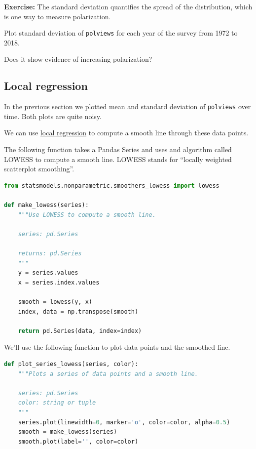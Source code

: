 \textbf{Exercise:} The standard deviation quantifies the spread of the
distribution, which is one way to measure polarization.

Plot standard deviation of \passthrough{\lstinline!polviews!} for each
year of the survey from 1972 to 2018.

Does it show evidence of increasing polarization?

\hypertarget{local-regression}{%
\subsection{Local regression}\label{local-regression}}

In the previous section we plotted mean and standard deviation of
\passthrough{\lstinline!polviews!} over time. Both plots are quite
noisy.

We can use \href{https://en.wikipedia.org/wiki/Local_regression}{local
regression} to compute a smooth line through these data points.

The following function takes a Pandas Series and uses and algorithm
called LOWESS to compute a smooth line. LOWESS stands for ``locally
weighted scatterplot smoothing''.

\begin{lstlisting}[language=Python,style=source]
from statsmodels.nonparametric.smoothers_lowess import lowess

def make_lowess(series):
    """Use LOWESS to compute a smooth line.
    
    series: pd.Series
    
    returns: pd.Series
    """
    y = series.values
    x = series.index.values

    smooth = lowess(y, x)
    index, data = np.transpose(smooth)

    return pd.Series(data, index=index) 
\end{lstlisting}

We'll use the following function to plot data points and the smoothed
line.

\begin{lstlisting}[language=Python,style=source]
def plot_series_lowess(series, color):
    """Plots a series of data points and a smooth line.
    
    series: pd.Series
    color: string or tuple
    """
    series.plot(linewidth=0, marker='o', color=color, alpha=0.5)
    smooth = make_lowess(series)
    smooth.plot(label='', color=color)
\end{lstlisting}


